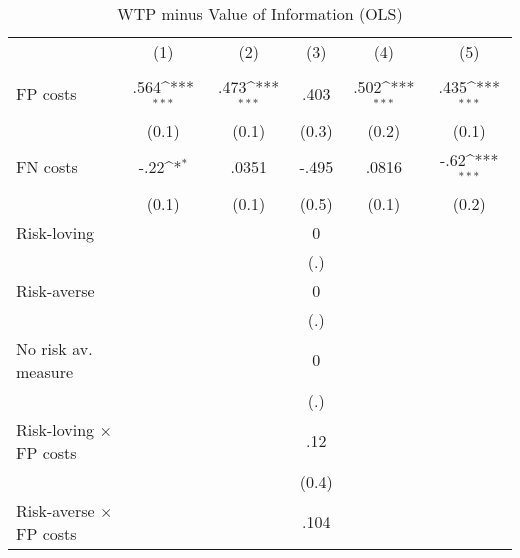 \begin{table}[H]\centering
\def\sym#1{\ifmmode^{#1}\else\(^{#1}\)\fi}
\caption{WTP minus Value of Information (OLS)}
\begin{tabular}{l*{5}{c}}
\hline\hline
                &\multicolumn{1}{c}{(1)}&\multicolumn{1}{c}{(2)}&\multicolumn{1}{c}{(3)}&\multicolumn{1}{c}{(4)}&\multicolumn{1}{c}{(5)}\\
                &\multicolumn{1}{c}{}&\multicolumn{1}{c}{}&\multicolumn{1}{c}{}&\multicolumn{1}{c}{}&\multicolumn{1}{c}{}\\
\hline
FP costs        &     .564\sym{***}&     .473\sym{***}&     .403         &     .502\sym{***}&     .435\sym{***}\\
                &    (0.1)         &    (0.1)         &    (0.3)         &    (0.2)         &    (0.1)         \\
FN costs        &     -.22\sym{*}  &    .0351         &    -.495         &    .0816         &     -.62\sym{***}\\
                &    (0.1)         &    (0.1)         &    (0.5)         &    (0.1)         &    (0.2)         \\
Risk-loving     &                  &                  &        0         &                  &                  \\
                &                  &                  &      (.)         &                  &                  \\
Risk-averse     &                  &                  &        0         &                  &                  \\
                &                  &                  &      (.)         &                  &                  \\
No risk av. measure&                  &                  &        0         &                  &                  \\
                &                  &                  &      (.)         &                  &                  \\
Risk-loving $\times$ FP costs&                  &                  &      .12         &                  &                  \\
                &                  &                  &    (0.4)         &                  &                  \\
Risk-averse $\times$ FP costs&                  &                  &     .104         &                  &                  \\

\end{tabular}
\end{table}
